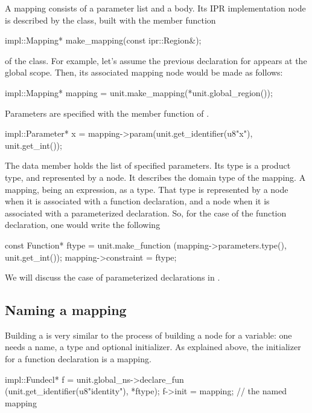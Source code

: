 \documentclass[11pt]{article}
\begin{document}
A mapping consists of a parameter list and a body.  Its IPR implementation
node is described by the class, built with the member
function 
\begin{Program}
  impl::Mapping* make_mapping(const ipr::Region&);
\end{Program}
of the  class.  For example, let's assume the previous
declaration for  appears at the global scope.  Then, its
associated mapping node would be made as follows:
\begin{Program}
impl::Mapping* mapping = unit.make_mapping(*unit.global_region());  
\end{Program}
Parameters are specified with the  member function
of .  
\begin{Program}
impl::Parameter* x = mapping->param(unit.get_identifier(u8"x"), unit.get_int());
\end{Program}

The data member 
holds the list of specified parameters.  Its type is a product type, and
represented by a  node.  It describes the domain type of
the mapping.  A mapping, being an expression, as a type.  That type is
represented by a  node when it is associated with a
function declaration, and a  node when it is associated
with a parameterized declaration.  So, for the case of the 
function declaration, one would write the following
\begin{Program}
const Function* ftype = unit.make_function
    (mapping->parameters.type(), unit.get_int());
mapping->constraint = ftype;  
\end{Program}

We will discuss the case of parameterized declarations in
. 

\subsection{Naming a mapping}
\label{sec:fun-decl:naming}

Building a  is very similar to the process of
building a node for a variable: one needs a name, a type and optional
initializer.  As explained above, the initializer for a function declaration
is a mapping.
\begin{Program}
impl::Fundecl* f = unit.global_ns->declare_fun
   (unit.get_identifier(u8"identity"), *ftype);
f->init = mapping;                        // the named mapping
\end{Program}
\end{document}
